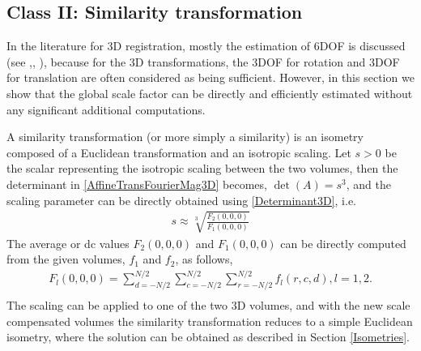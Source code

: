 \documentclass{UCF_ETD}
\begin{document}
\subsection{Class II: Similarity transformation}
In the literature for 3D registration, mostly the estimation of $6$DOF is discussed (see \cite{Salah2013},\cite{Bulow2013}, \cite{Jiaolong2016}), because for the $3$D transformations, the $3$DOF for rotation and $3$DOF for translation are often considered as being sufficient. However, in this section we show that the global scale factor can be directly and efficiently estimated without any significant additional computations. 

A similarity transformation (or more simply a similarity) is an isometry composed of a Euclidean transformation and an isotropic scaling. Let $s > 0$ be the scalar representing the isotropic scaling between the two volumes, then the determinant in \eqref{AffineTransFourierMag3D} becomes, 
$\det(A) = s^3$, and the scaling parameter can be directly obtained using \eqref{Determinant3D}, i.e.
\begin{eqnarray} \label{3DScaleEstimation}
s \approx \sqrt[3]{\frac{F_2(0,0,0)}{F_1(0,0,0)}}
\end{eqnarray}
The average or dc values $F_2(0,0,0)$ and $F_1(0,0,0)$ can be directly computed from the given volumes, $f_1$ and $f_2$, as follows,
\begin{eqnarray} \label{AverageDCValue}
F_l( 0, 0, 0 ) = \sum\limits_{d=-N/2}^{N/2} \sum\limits_{c=-N/2}^{N/2}\sum\limits_{r= -N/2}^{N/2} f_l(r,c,d), l = 1,2. \nonumber \\
\end{eqnarray}
The scaling can be applied to one of the two $3$D volumes, and with the new scale compensated volumes the similarity transformation reduces to a simple Euclidean isometry, where the solution can be obtained as described in Section \ref{Isometries}.
\end{document}
